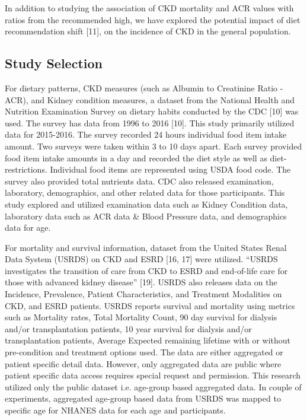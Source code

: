 \noindent 
In addition to studying the association of CKD mortality and ACR values with ratios from the recommended high, we have explored the potential impact of diet recommendation shift [11], on the incidence of CKD in the general population.

\subsection{Study Selection}

\medskip 

\noindent For dietary patterns, CKD measures (such as Albumin to Creatinine Ratio - ACR), and Kidney condition measures, a dataset from the National Health and Nutrition Examination Survey on dietary habits conducted by the CDC [10] was used. The survey has data from 1996 to 2016 [10]. This study primarily utilized data for 2015-2016. The survey recorded 24 hours individual food item intake amount. Two surveys were taken within 3 to 10 days apart. Each survey provided food item intake amounts in a day and recorded the diet style as well as diet-restrictions. Individual food items are represented using USDA food code. The survey also provided total nutrients data. CDC also released examination, laboratory, demographics, and other related data for those participants. This study explored and utilized examination data such as Kidney Condition data, laboratory data such as ACR data \& Blood Pressure data, and demographics data for age.

\medskip 
\noindent For mortality and survival information, dataset from the United States Renal Data System (USRDS) on CKD and ESRD [16, 17] were utilized. “USRDS investigates the transition of care from CKD to ESRD and end-of-life care for those with advanced kidney disease” [19]. USRDS also releases data on the Incidence, Prevalence, Patient Characteristics, and Treatment Modalities on CKD, and ESRD patients. USRDS  reports survival and mortality using metrics such as Mortality rates, Total Mortality Count,  90 day survival for dialysis and/or transplantation patients,  10 year survival for dialysis and/or transplantation patients, Average Expected remaining lifetime with or without pre-condition and treatment options used.  The data are either aggregated or patient specific detail data. However, only aggregated data are public where patient specific data access requires special request and permission. This research utilized only the public dataset i.e. age-group based aggregated data. In couple of experiments, aggregated age-group based data from USRDS was mapped to specific age for NHANES data for each age and participants.

